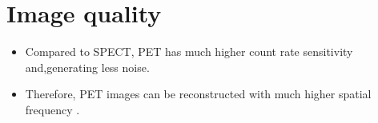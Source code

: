 \section{Image quality}
\begin{itemize}
\item Compared to SPECT, PET has much higher count rate sensitivity
  and,generating less noise.
\item Therefore, PET images can be reconstructed with much higher
  spatial frequency \cite{abdulla2025NIQ}.
\end{itemize}
